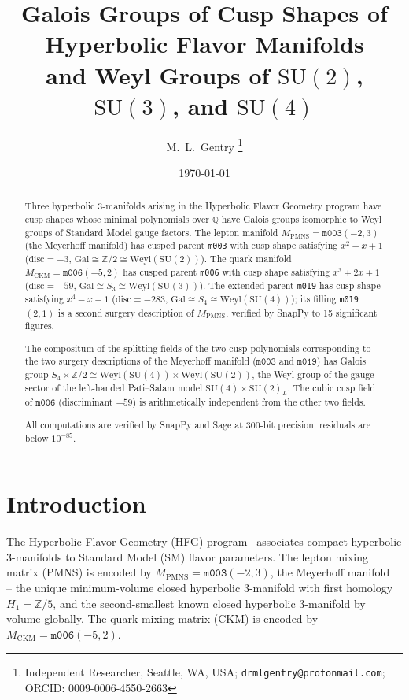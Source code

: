\documentclass[11pt,a4paper]{article}
\theoremstyle{definition}
\theoremstyle{remark}
\newcommand{\Z}{\mathbb{Z}}
\newcommand{\Q}{\mathbb{Q}}
\newcommand{\mfld}[1]{\texttt{#1}}
\newcommand{\Gal}{\mathrm{Gal}}
\newcommand{\SU}{\mathrm{SU}}
\newcommand{\Weyl}{\mathrm{Weyl}}
\newcommand{\disc}{\mathrm{disc}}
\begin{document}
\title{Galois Groups of Cusp Shapes of Hyperbolic Flavor Manifolds\\
and Weyl Groups of $\SU(2)$, $\SU(3)$, and $\SU(4)$}

\author{M.~L.~Gentry%
\thanks{Independent Researcher, Seattle, WA, USA;
\texttt{drmlgentry@protonmail.com};
ORCID: 0009-0006-4550-2663}}
\date{\today}
\maketitle

\begin{abstract}
Three hyperbolic 3-manifolds arising in the Hyperbolic Flavor
Geometry program have cusp shapes whose minimal polynomials
over $\Q$ have Galois groups isomorphic to Weyl groups of
Standard Model gauge factors.
The lepton manifold $M_{\mathrm{PMNS}}=\mfld{m003}(-2,3)$
(the Meyerhoff manifold) has cusped parent \mfld{m003} with
cusp shape satisfying $x^2-x+1$ ($\disc=-3$, $\Gal\cong\Z/2
\cong\Weyl(\SU(2))$).
The quark manifold $M_{\mathrm{CKM}}=\mfld{m006}(-5,2)$ has
cusped parent \mfld{m006} with cusp shape satisfying
$x^3+2x+1$ ($\disc=-59$, $\Gal\cong S_3\cong\Weyl(\SU(3))$).
The extended parent \mfld{m019} has cusp shape satisfying
$x^4-x-1$ ($\disc=-283$, $\Gal\cong S_4\cong\Weyl(\SU(4))$);
its filling \mfld{m019}$(2,1)$ is a second surgery description
of $M_{\mathrm{PMNS}}$, verified by SnapPy to 15 significant
figures.

The compositum of the splitting fields of the two cusp polynomials
corresponding to the two surgery descriptions of the Meyerhoff
manifold ($\mfld{m003}$ and $\mfld{m019}$) has Galois group
$S_4\times\Z/2\cong\Weyl(\SU(4))\times\Weyl(\SU(2))$, the Weyl
group of the gauge sector of the left-handed Pati--Salam model
$\SU(4)\times\SU(2)_L$.  The cubic cusp field of $\mfld{m006}$
(discriminant $-59$) is arithmetically independent from the
other two fields.

All computations are verified by SnapPy and Sage at 300-bit
precision; residuals are below $10^{-85}$.
\end{abstract}

\section{Introduction}

The Hyperbolic Flavor Geometry (HFG) program~\cite{GentryUnified}
associates compact hyperbolic 3-manifolds to Standard Model (SM)
flavor parameters.
The lepton mixing matrix (PMNS) is encoded by
$M_{\mathrm{PMNS}}=\mfld{m003}(-2,3)$,
the Meyerhoff manifold~\cite{GMM} -- the unique
minimum-volume closed hyperbolic 3-manifold with
first homology $H_1=\Z/5$, and the second-smallest
known closed hyperbolic 3-manifold by volume globally.
The quark mixing matrix (CKM) is encoded by
$M_{\mathrm{CKM}}=\mfld{m006}(-5,2)$.
\end{document}

